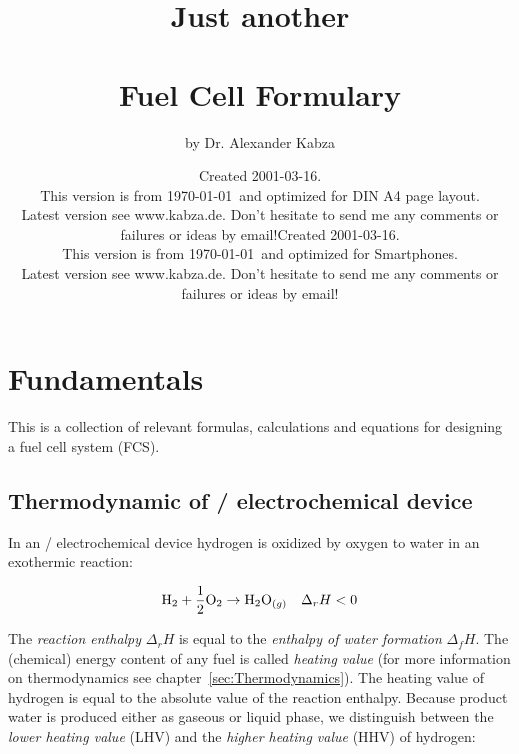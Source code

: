 \documentclass[11pt,a4paper,english,twoside]{scrreprt}
\begin{document}

\title{\Large Just another \\ \ \\ \Huge Fuel Cell Formulary}
\author{\Large by Dr. Alexander Kabza}
\begin{A4}
  \date{\scriptsize Created 2001-03-16.\\This version is from \today\ and optimized for DIN A4 page layout.\\ Latest version see www.kabza.de.
  Don't hesitate to send me any comments or failures or ideas by email!}
\end{A4}  
\begin{Smartphone}
  \date{\scriptsize Created 2001-03-16.\\This version is from \today\ and optimized for Smartphones.\\ Latest version see www.kabza.de.
  Don't hesitate to send me any comments or failures or ideas by email!}
\end{Smartphone} 
 
\maketitle

\tableofcontents    %


\chapter{Fundamentals}

This is a collection of relevant formulas, calculations and equations for designing a fuel cell system (FCS).


\section{Thermodynamic of / electrochemical device}

In an / electrochemical device hydrogen is oxidized by oxygen to water in an exothermic reaction:

\[\ce{H2} + \frac 12 \ce{O2} \to \ce{H2O}_{(g)} \quad \Delta_r H < 0\]

The \textit{reaction enthalpy} $\Delta_r H$ is equal to the \textit{enthalpy of water formation} $\Delta_f H$. The (chemical) energy content of any fuel is called \textit{heating value} (for more information on thermodynamics see chapter~\ref{sec:Thermodynamics}). The heating value of hydrogen is equal to the absolute value of the reaction enthalpy. Because product water is produced either as gaseous or liquid phase, we distinguish between the \textit{lower heating value} (LHV) and the \textit{higher heating value} (HHV) of hydrogen:
\end{document}

